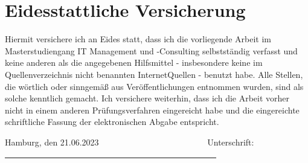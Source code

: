 \chapter*{Eidesstattliche Versicherung}
\thispagestyle{empty}

Hiermit versichere ich an Eides statt, dass ich die vorliegende Arbeit im Masterstudiengang IT Management und -Consulting selbstständig verfasst und keine anderen als die angegebenen Hilfsmittel - insbesondere keine im Quellenverzeichnis nicht benannten InternetQuellen - benutzt habe. 
Alle Stellen, die wörtlich oder sinngemäß aus Veröffentlichungen entnommen wurden, sind als solche kenntlich gemacht.
Ich versichere weiterhin, dass ich die Arbeit vorher nicht in einem anderen Prüfungsverfahren eingereicht habe und die eingereichte schriftliche Fassung der elektronischen Abgabe entspricht.


\vspace{2cm} 


\noindent Hamburg, den 21.06.2023 ~~~~~~~~~~~~~~~~~~~~~~~~~Unterschrift: \uline{~~~~~~~~~~~~~~~~~~~~~~~~~~~~~~~~~~~~~~~~~~~~~~~~~~} 

